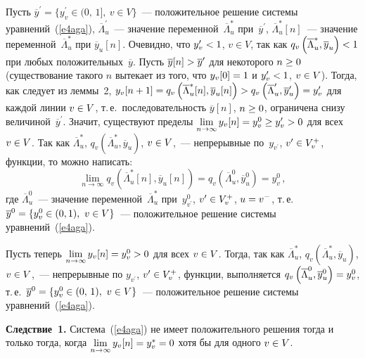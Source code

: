 \begin{multicols}{2}
     Пусть $\overline{y}^\prime =\{ y_v^\prime \in (0,\,1],\ v\in V\}$~--- 
положительное решение системы уравнений~(\ref{e4aga}), 
$\overline{\Lambda}_u^\prime$~--- значение 
переменной~$\overline{\Lambda}^*_u$ при~$\overline{y}^\prime$, 
$\overline{\Lambda}_u^*[n]$~--- значение 
переменной~$\overline{\Lambda}^*_u$ при $\overline{y}_u[n]$. Очевидно, что
$y_v^\prime \hm<1$, $v\in V$, так как $q_v\left(\overline{\Lambda}_u^*, 
\overline{y}_u\right)\hm<1$ при любых положительных~$\overline{y}$. Пусть 
 $\overline{y}[n]\hm>\overline{y}^\prime$  для 
некоторого $n\hm\geq 0$
(существование такого $n$ вытекает из того, что $y_v[0]\hm=1$ и 
$y_v^\prime \hm<1$, $v\hm\in V$). Тогда, как следует из леммы~2, 
$y_v[n+1]\hm=q_v\left(\overline{\Lambda}^*_u[n], 
\overline{y}_u[n]\right)\hm > q_v\left(\overline{\Lambda}_u^\prime, 
\overline{y}_u^\prime\right)\hm=y_v^\prime$
для 
каждой линии $v\hm\in V$, т.\,е.\ последовательность 
$\overline{y}[n]$, $n\hm\geq 0$, ограничена снизу 
величиной~$\overline{y}^\prime$. Значит, существуют пределы 
$\lim\limits_{n\rightarrow\infty} y_v[n]\hm=y_v^0\hm\geq y_v^\prime\hm>0$ 
для всех $v\hm\in V$. Так как $\overline{\Lambda}^*_u$, 
$q_v\left(\overline{\Lambda}_u^*, \overline{y}_u\right)$, $v\hm\in V$,~--- непрерывные 
по~$y_{v^\prime}$, $v^\prime\hm\in V^+_v$, функции, то можно написать: 
$$
\lim\limits_{n\rightarrow\infty} q_v \left(\overline{\Lambda}_u^*[n], 
\overline{y}_u[n]\right)= q_v\left(\overline{\Lambda}_u^0, 
\overline{y}_u^0\right)=y_v^0\,,
$$ 
где 
$\overline{\Lambda}_u^0$~--- значение 
переменной~$\overline{\Lambda}_u^*$ при~$y^0_{v^\prime}$, 
$v^\prime\hm\in V_v^+$, $u\hm=v^-$, т.\,е.\ $\overline{y}^0\hm=\{ y^0_v\in 
(0,1),\ v\in V\}$~--- положительное решение системы 
уравнений~(\ref{e4aga}). 
     
     Пусть теперь $\lim\limits_{n\rightarrow\infty} y_v[n]\hm=y_v^0\hm>0$ 
для всех $v\hm\in V$. Тогда, так как $\overline{\Lambda}_u^*$, 
$q_v\left(\overline{\Lambda}_u^*, \overline{y}_u\right)$, $v\hm\in V$,~--- непрерывные по 
$y_{v^\prime}$, $v^\prime\hm\in V_v^+$, функции, выполняется 
$q_v\left(\overline{\Lambda}_u^0, \overline{y}_u^0\right)\hm=y_v^0$, т.\,е.\ 
$\overline{y}^0\hm=\{ y_v^0\in (0,\,1), \ v\hm\in V\}$~--- положительное 
решение системы уравнений~(\ref{e4aga}). 
     \medskip
     
     \noindent
     \textbf{Следствие~1.} Система~(\ref{e4aga}) не имеет положительного 
решения тогда и только тогда, когда $\lim\limits_{n\rightarrow\infty} 
y_v[n]\hm=y_v^*\hm=0$ хотя бы для одного $v\hm\in V$.
     

\end{multicols}
